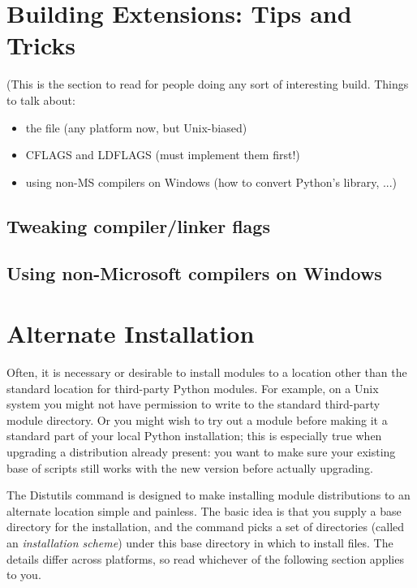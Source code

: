 \documentclass{howto}
\begin{document}
\section{Building Extensions: Tips and Tricks}
\label{building-ext}

(This is the section to read for people doing any sort of interesting
build.  Things to talk about:
\begin{itemize}
\item the  file (any platform now, but Unix-biased)
\item CFLAGS and LDFLAGS (must implement them first!)
\item using non-MS compilers on Windows (how to convert
  Python's library, ...)  
\end{itemize}


\subsection{Tweaking compiler/linker flags}
\label{tweak-flags}


\subsection{Using non-Microsoft compilers on Windows}
\label{non-ms-compilers}




\section{Alternate Installation}
\label{alt-install}

Often, it is necessary or desirable to install modules to a location
other than the standard location for third-party Python modules.  For
example, on a Unix system you might not have permission to write to the
standard third-party module directory.  Or you might wish to try out a
module before making it a standard part of your local Python
installation; this is especially true when upgrading a distribution
already present: you want to make sure your existing base of scripts
still works with the new version before actually upgrading.

The Distutils  command is designed to make installing
module distributions to an alternate location simple and painless.  The
basic idea is that you supply a base directory for the installation, and
the  command picks a set of directories (called an
\emph{installation scheme}) under this base directory in which to
install files.  The details differ across platforms, so read whichever
of the following section applies to you.
\end{document}
